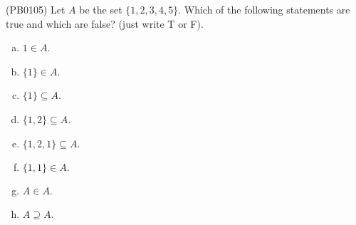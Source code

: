 (PB0105) Let $A$ be the set $\{1,2,3,4,5\}$. Which of the following statements are true and which are false? (just write T or F).
\begin{multicols}{2}
\begin{enumerate}[(a)]
\item $1\in A$. 
\item $\{1\}\in A$.
\item $\{1\}\subseteq A$.
\item $\{1,2\}\subseteq A$.
\item $\{1,2,1\}\subseteq A.$
\item $\{1,1\}\in A.$
\item $A\in A$.
\item $A\supseteq A$.
\end{enumerate}
\end{multicols}
